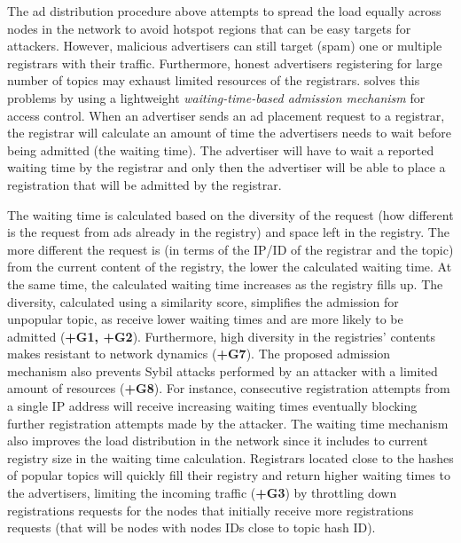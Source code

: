   The ad distribution procedure above attempts to spread the load equally across nodes in the network to avoid hotspot regions that can be easy targets for attackers. 
 However, malicious advertisers can still target (\ie spam) one or multiple registrars with their traffic. 
Furthermore,  honest advertisers registering for large number of topics may exhaust limited resources of the registrars. 
 \sysname solves this problems by using a lightweight \textit{waiting-time-based admission mechanism} for access control. When an advertiser sends an ad placement request to a registrar, the registrar will calculate an amount of time the advertisers needs to wait before being admitted (\ie the waiting time). 
The advertiser will have to wait a reported waiting time by the registrar and only then the advertiser will be able to place a registration that will be admitted by the registrar.
 
The waiting time is calculated based on the diversity of the request (\ie how different is the request from ads already in the registry) and space left in the registry. 
The more different the request is (in terms of the IP/ID of the registrar and the topic) from the current content of the registry, the lower the calculated waiting time. 
At the same time, the calculated waiting time increases as the registry fills up. 
The diversity,  calculated using a similarity score,  simplifies the admission for unpopular topic, as receive lower waiting times and are more likely to be admitted (\textbf{+G1, +G2}).
Furthermore,  high diversity in the registries' contents makes \sysname resistant to network dynamics (\textbf{+G7}). The proposed admission mechanism also prevents Sybil attacks performed by an attacker with a limited amount of resources (\textbf{+G8}). 
For instance, consecutive registration attempts from a single IP address will receive increasing waiting times eventually blocking further registration attempts made by the attacker. 
The waiting time mechanism also improves the load distribution in the network since it includes to current registry size in the waiting time calculation.
Registrars located close to the hashes of popular topics will quickly fill their registry and return higher waiting times to the advertisers, limiting the incoming traffic (\textbf{+G3}) by throttling down registrations requests for the nodes that initially receive more registrations requests (that will be nodes with nodes IDs close to topic hash ID).

